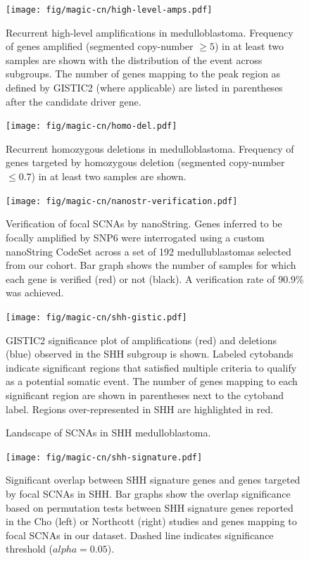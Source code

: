 \documentclass[11pt,letterpaper]{article}
\theoremstyle{definition}
\begin{document}
\begin{figure}
	\centering
	\texttt{[image: fig/magic-cn/high-level-amps.pdf]}
	\caption{Recurrent high-level amplifications in medulloblastoma.
	Frequency of genes amplified (segmented copy-number $\geq 5$) in at least two samples are shown with the distribution of the event across subgroups. The number of genes mapping to the peak region as defined by GISTIC2 (where applicable) are listed in parentheses after the candidate driver gene.}
	\label{fig:high-level-amps}
\end{figure}

\begin{figure}
	\centering
	\texttt{[image: fig/magic-cn/homo-del.pdf]}
	\caption{Recurrent homozygous deletions in medulloblastoma. Frequency of genes targeted by homozygous deletion (segmented copy-number $\leq 0.7$) in at least two samples are shown.}
	\label{fig:homo-del}
\end{figure}

\begin{figure}
	\centering
	\texttt{[image: fig/magic-cn/nanostr-verification.pdf]}
	\caption{Verification of focal SCNAs by nanoString.
	Genes inferred to be focally amplified by SNP6 were interrogated using a custom nanoString CodeSet across a set of 192 medullublastomas selected from our cohort. Bar graph shows the number of samples for which each gene is verified (red) or not (black). A verification rate of 90.9\% was achieved.}
	\label{fig:nanostr-verification}
\end{figure}

\clearpage

\begin{figure}[h]
	\begin{center}
		\texttt{[image: fig/magic-cn/shh-gistic.pdf]}
	\end{center}
	\caption{Landscape of SCNAs in SHH medulloblastoma.}
	GISTIC2 significance plot of amplifications (red) and deletions (blue) observed in the SHH subgroup is shown.
	Labeled cytobands indicate significant regions that satisfied multiple criteria to qualify as a potential somatic event. The number of genes mapping to each significant region are shown in parentheses next to the cytoband label.  Regions over-represented in SHH are highlighted in red.
	\label{fig:shh-gistic}
\end{figure}

\clearpage

\begin{figure}
	\centering
	\texttt{[image: fig/magic-cn/shh-signature.pdf]}
	\caption{Significant overlap between SHH signature genes and genes targeted by focal SCNAs in SHH.
		Bar graphs show the overlap significance based on permutation tests between SHH signature genes reported in the Cho (left) or Northcott (right) studies and genes mapping to focal SCNAs in our dataset. Dashed line indicates significance threshold ($alpha = 0.05$).}
	\label{fig:shh-signature}
\end{figure}
\end{document}
